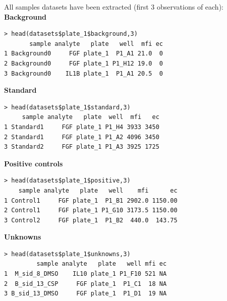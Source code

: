 \documentclass[11pt]{article}\usepackage[]{graphicx}\usepackage[]{color}
\makeatletter
\newenvironment{kframe}{%
 \def\at@end@of@kframe{}%
 \ifinner\ifhmode%
  \def\at@end@of@kframe{\end{minipage}}%
  \begin{minipage}{\columnwidth}%
 \fi\fi%
 \def\FrameCommand##1{\hskip\@totalleftmargin \hskip-\fboxsep
 \colorbox{shadecolor}{##1}\hskip-\fboxsep
     \hskip-\linewidth \hskip-\@totalleftmargin \hskip\columnwidth}%
 \MakeFramed {\advance\hsize-\width
   \@totalleftmargin\z@ \linewidth\hsize
   \@setminipage}}%
 {\par\unskip\endMakeFramed%
 \at@end@of@kframe}
\newenvironment{knitrout}{}{} %
\makeatother
\begin{document}
\noindent All samples datasets have been extracted 
(first 3 observations of each):\\

\noindent \textbf{Background}
\begin{knitrout}
\color{fgcolor}\begin{kframe}
\begin{verbatim}
> head(datasets$plate_1$background,3)
       sample analyte   plate   well  mfi ec
1 Background0     FGF plate_1  P1_A1 21.0  0
2 Background0     FGF plate_1 P1_H12 19.0  0
3 Background0    IL1B plate_1  P1_A1 20.5  0
\end{verbatim}
\end{kframe}
\end{knitrout}

\noindent \textbf{Standard}
\begin{knitrout}
\color{fgcolor}\begin{kframe}
\begin{verbatim}
> head(datasets$plate_1$standard,3)
     sample analyte   plate  well  mfi   ec
1 Standard1     FGF plate_1 P1_H4 3933 3450
2 Standard1     FGF plate_1 P1_A2 4096 3450
3 Standard2     FGF plate_1 P1_A3 3925 1725
\end{verbatim}
\end{kframe}
\end{knitrout}

\noindent \textbf{Positive controls}
\begin{knitrout}
\color{fgcolor}\begin{kframe}
\begin{verbatim}
> head(datasets$plate_1$positive,3)
    sample analyte   plate   well    mfi      ec
1 Control1     FGF plate_1  P1_B1 2902.0 1150.00
2 Control1     FGF plate_1 P1_G10 3173.5 1150.00
3 Control2     FGF plate_1  P1_B2  440.0  143.75
\end{verbatim}
\end{kframe}
\end{knitrout}

\noindent \textbf{Unknowns}
\begin{knitrout}
\color{fgcolor}\begin{kframe}
\begin{verbatim}
> head(datasets$plate_1$unknowns,3)
         sample analyte   plate   well mfi ec
1  M_sid_8_DMSO    IL10 plate_1 P1_F10 521 NA
2  B_sid_13_CSP     FGF plate_1  P1_C1  18 NA
3 B_sid_13_DMSO     FGF plate_1  P1_D1  19 NA
\end{verbatim}
\end{kframe}
\end{knitrout}
\end{document}
